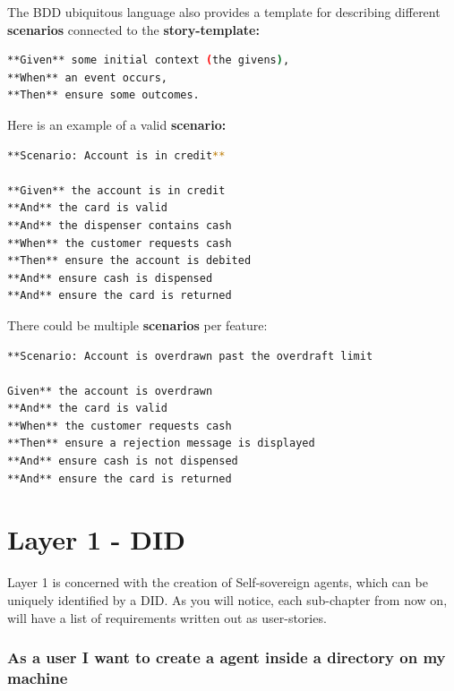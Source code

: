 The BDD ubiquitous language also provides a template for describing
different \textbf{scenarios} connected to the \textbf{story-template:}

\begin{lstlisting}[language=bash]
**Given** some initial context (the givens),  
**When** an event occurs,  
**Then** ensure some outcomes.
\end{lstlisting}

Here is an example of a valid \textbf{scenario:}

\begin{lstlisting}[language=bash]
**Scenario: Account is in credit**

**Given** the account is in credit
**And** the card is valid
**And** the dispenser contains cash
**When** the customer requests cash
**Then** ensure the account is debited
**And** ensure cash is dispensed
**And** ensure the card is returned
\end{lstlisting}

There could be multiple \textbf{scenarios} per feature:

\begin{lstlisting}[language=bash]
**Scenario: Account is overdrawn past the overdraft limit

Given** the account is overdrawn
**And** the card is valid
**When** the customer requests cash
**Then** ensure a rejection message is displayed
**And** ensure cash is not dispensed
**And** ensure the card is returned
\end{lstlisting}

\hypertarget{layer-1---did}{%
\section{Layer 1 - DID}\label{layer-1---did}}

Layer 1 is concerned with the creation of Self-sovereign agents, which
can be uniquely identified by a DID. As you will notice, each
sub-chapter from now on, will have a list of requirements written out as
user-stories.

\hypertarget{as-a-user-i-want-to-create-a-agent-inside-a-directory-on-my-machine}{%
\subsubsection{\texorpdfstring{\textbf{As a user I want to create a
agent inside a directory on my
machine}}{As a user I want to create a agent inside a directory on my machine}}\label{as-a-user-i-want-to-create-a-agent-inside-a-directory-on-my-machine}}

